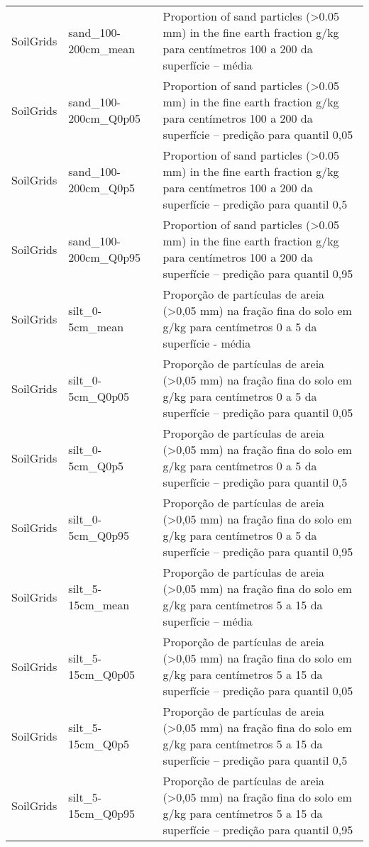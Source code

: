 \begin{longtable}{@{} p{4cm} p{4cm} p{8cm} @{}}
	SoilGrids &
	sand\_100-200cm\_mean &
	Proportion of sand particles (\textgreater 0.05 mm) in the fine earth fraction g/kg para centímetros 100 a 200 da superfície – média \\
	SoilGrids &
	sand\_100-200cm\_Q0p05 &
	Proportion of sand particles (\textgreater 0.05 mm) in the fine earth fraction g/kg para centímetros 100 a 200 da superfície – predição para quantil 0,05 \\
	SoilGrids &
	sand\_100-200cm\_Q0p5 &
	Proportion of sand particles (\textgreater 0.05 mm) in the fine earth fraction g/kg para centímetros 100 a 200 da superfície – predição para quantil 0,5 \\
	SoilGrids &
	sand\_100-200cm\_Q0p95 &
	Proportion of sand particles (\textgreater 0.05 mm) in the fine earth fraction g/kg para centímetros 100 a 200 da superfície – predição para quantil 0,95 \\
	SoilGrids &
	silt\_0-5cm\_mean &
	Proporção de partículas de areia (\textgreater 0,05 mm) na fração fina do solo em g/kg para centímetros 0 a 5 da superfície - média \\
	SoilGrids &
	silt\_0-5cm\_Q0p05 &
	Proporção de partículas de areia (\textgreater 0,05 mm) na fração fina do solo em g/kg para centímetros 0 a 5 da superfície – predição para quantil 0,05 \\
	SoilGrids &
	silt\_0-5cm\_Q0p5 &
	Proporção de partículas de areia (\textgreater 0,05 mm) na fração fina do solo em g/kg para centímetros 0 a 5 da superfície – predição para quantil 0,5 \\
	SoilGrids &
	silt\_0-5cm\_Q0p95 &
	Proporção de partículas de areia (\textgreater 0,05 mm) na fração fina do solo em g/kg para centímetros 0 a 5 da superfície – predição para quantil 0,95 \\
	SoilGrids &
	silt\_5-15cm\_mean &
	Proporção de partículas de areia (\textgreater 0,05 mm) na fração fina do solo em g/kg para centímetros 5 a 15 da superfície – média \\
	SoilGrids &
	silt\_5-15cm\_Q0p05 &
	Proporção de partículas de areia (\textgreater 0,05 mm) na fração fina do solo em g/kg para centímetros 5 a 15 da superfície – predição para quantil 0,05 \\
	SoilGrids &
	silt\_5-15cm\_Q0p5 &
	Proporção de partículas de areia (\textgreater 0,05 mm) na fração fina do solo em g/kg para centímetros 5 a 15 da superfície – predição para quantil 0,5 \\
	SoilGrids &
	silt\_5-15cm\_Q0p95 &
	Proporção de partículas de areia (\textgreater 0,05 mm) na fração fina do solo em g/kg para centímetros 5 a 15 da superfície – predição para quantil 0,95 \\

\end{longtable}
